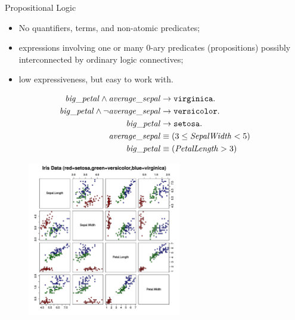 \documentclass[presentation]{beamer}\mode<presentation>{\usetheme{AMSBolognaFC}}
\begin{document}
\begin{frame}[allowframebreaks]{Propositional Logic}
    \begin{itemize}
        \item No quantifiers, terms, and non-atomic predicates;
        \item expressions involving one or many 0-ary predicates (propositions) possibly interconnected by ordinary logic connectives;
        \item low expressiveness, but easy to work with.
    \end{itemize}
    \centering
    \begin{equation*}
        \begin{aligned}
            \mathit{big\_petal}\wedge\mathit{average\_sepal}&\rightarrow\mathtt{virginica}.\\
            \mathit{big\_petal}\wedge\neg\mathit{average\_sepal}&\rightarrow\mathtt{versicolor}.\\
            \mathit{big\_petal}&\rightarrow\mathtt{setosa}.\\
            \mathit{average\_sepal}&\equiv(3\le\mathit{SepalWidth}<5)\\
            \mathit{big\_petal}&\equiv(\mathit{PetalLength}>3)\\
        \end{aligned}    
    \end{equation*}
    
    \framebreak
    
    \begin{figure}
        \centering
        \includegraphics[width=0.6\textwidth]{figures/iris-dataset}
    \end{figure}

\end{frame}
\end{document}
